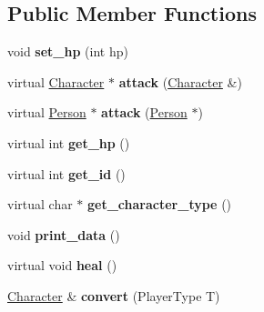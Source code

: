 \subsection*{Public Member Functions}
\begin{DoxyCompactItemize}
\item 
\hypertarget{class_character_a94c3b14ee3f87d9740a12dba0eb65534}{void {\bfseries set\-\_\-hp} (int hp)}\label{class_character_a94c3b14ee3f87d9740a12dba0eb65534}

\item 
\hypertarget{class_character_a8ae210154a514c5c6c0a5dbfb5cbf8db}{virtual \hyperlink{class_character}{Character} $\ast$ {\bfseries attack} (\hyperlink{class_character}{Character} \&)}\label{class_character_a8ae210154a514c5c6c0a5dbfb5cbf8db}

\item 
\hypertarget{class_character_ae76d4df2c954ffdf55ef73560c778950}{virtual \hyperlink{class_person}{Person} $\ast$ {\bfseries attack} (\hyperlink{class_person}{Person} $\ast$)}\label{class_character_ae76d4df2c954ffdf55ef73560c778950}

\item 
\hypertarget{class_character_a39658f9ea6c4f6bc8330a73b9ea6177b}{virtual int {\bfseries get\-\_\-hp} ()}\label{class_character_a39658f9ea6c4f6bc8330a73b9ea6177b}

\item 
\hypertarget{class_character_a43b86db76f3c3f2c320c1122848f9bd8}{virtual int {\bfseries get\-\_\-id} ()}\label{class_character_a43b86db76f3c3f2c320c1122848f9bd8}

\item 
\hypertarget{class_character_afcf8a07ca3e5cd4af6d05fae7b0edff9}{virtual char $\ast$ {\bfseries get\-\_\-character\-\_\-type} ()}\label{class_character_afcf8a07ca3e5cd4af6d05fae7b0edff9}

\item 
\hypertarget{class_character_a4e86af41dea9b5422b90f3abcd09efc6}{void {\bfseries print\-\_\-data} ()}\label{class_character_a4e86af41dea9b5422b90f3abcd09efc6}

\item 
\hypertarget{class_character_a3871907535bb9cf3a042822e2dd1ec5c}{virtual void {\bfseries heal} ()}\label{class_character_a3871907535bb9cf3a042822e2dd1ec5c}

\item 
\hypertarget{class_character_a00f45ae6f4660427482165ddc1e7c792}{\hyperlink{class_character}{Character} \& {\bfseries convert} (Player\-Type T)}\label{class_character_a00f45ae6f4660427482165ddc1e7c792}

\end{DoxyCompactItemize}
